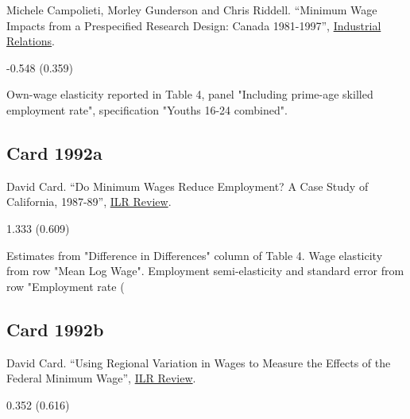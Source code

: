 \noindent Michele Campolieti, Morley Gunderson and Chris Riddell. ``Minimum Wage Impacts from a Prespecified Research Design: Canada 1981-1997'', \href{https://doi.org/10.1111/j.1468-232X.2006.00424.x}{Industrial Relations}.

\vspace{0.7em}

 -0.548 (0.359)

\vspace{0.7em}

 Own-wage elasticity reported in Table 4, panel "Including prime-age skilled employment rate", specification "Youths 16-24 combined".

\subsection*{Card 1992a}
\vspace{-0.7em}

\noindent David Card. ``Do Minimum Wages Reduce Employment? A Case Study of California, 1987-89'', \href{https://doi.org/10.1177/001979399204600104}{ILR Review}.

\vspace{0.7em}

 1.333 (0.609)

\vspace{0.7em}

 Estimates from "Difference in Differences" column of Table 4. Wage elasticity from row "Mean Log Wage". Employment semi-elasticity and standard error from row "Employment rate (%

\subsection*{Card 1992b}
\vspace{-0.7em}

\noindent David Card. ``Using Regional Variation in Wages to Measure the Effects of the Federal Minimum Wage'', \href{https://doi.org/10.1177/001979399204600103}{ILR Review}.

\vspace{0.7em}

 0.352 (0.616)

\vspace{0.7em}

